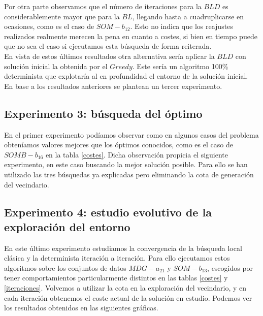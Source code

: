 \documentclass[11pt,a4paper]{article}
\begin{document}
	Por otra parte observamos que el número de iteraciones para la $BLD$ es considerablemente mayor que para la $BL$, llegando hasta a cuadruplicarse en ocasiones, como es el caso de $SOM-b_12$. Esto no indica que los reajustes realizados realmente merecen la pena en cuanto a costes, si bien en tiempo puede que no sea el caso si ejecutamos esta búsqueda de forma reiterada. \\
	
	En vista de estos últimos resultados otra alternativa sería aplicar la $BLD$ con solución inicial la obtenida por el $Greedy$. Este sería un algoritmo 100\% determinista que explotaría al en profundidad el entorno de la solución inicial. \\
	
	En base a los resultados anteriores se plantean un tercer experimento.  \\
	
	\subsection{ Experimento 3: búsqueda del óptimo }
	
	En el primer experimento podíamos observar como en algunos casos del problema obteníamos valores mejores que los óptimos conocidos, como es el caso de $SOMB-b_16$ en la tabla \ref{costes}. Dicha observación propicia el siguiente experimento, en este caso buscando la mejor solución posible. Para ello se han utilizado las tres búsquedas ya explicadas pero eliminando la cota de generación del vecindario.
	
	\subsection{ Experimento 4: estudio evolutivo de la exploración del entorno }
	
	En este último experimento estudiamos la convergencia de la búsqueda local clásica y la determinista iteración a iteración. Para ello ejecutamos estos algoritmos sobre los conjuntos de datos $MDG-a_21$ y $SOM-b_13$, escogidos por tener comportamientos particularmente distintos en las tablas \ref{costes} y \ref{iteraciones}. Volvemos a utilizar la cota en la exploración del vecindario, y en cada iteración obtenemos el coste actual de la solución en estudio. Podemos ver los resultados obtenidos en las siguientes gráficas.
	
\end{document}
